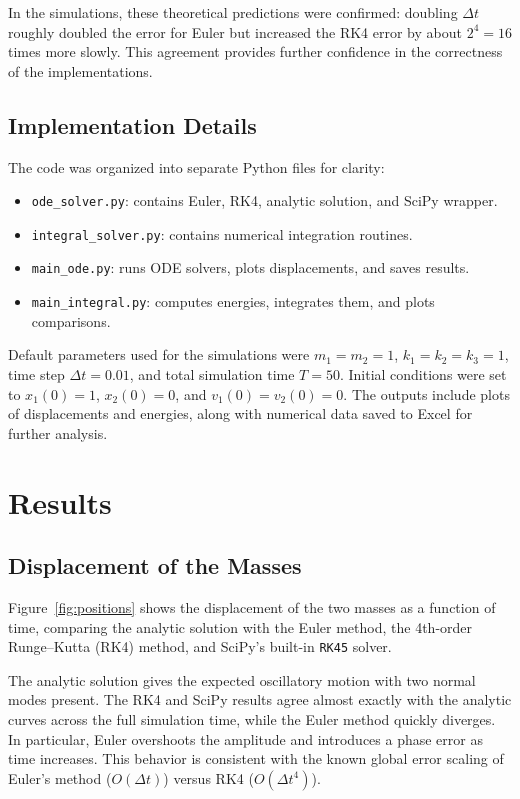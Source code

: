 \documentclass[12pt]{article}
\begin{document}
In the simulations, these theoretical predictions were confirmed: doubling $\Delta t$ roughly doubled the error for Euler but increased the RK4 error by about $2^4 = 16$ times more slowly. This agreement provides further confidence in the correctness of the implementations.


\subsection{Implementation Details}
The code was organized into separate Python files for clarity:
\begin{itemize}
    \item \texttt{ode\_solver.py}: contains Euler, RK4, analytic solution, and SciPy wrapper.
    \item \texttt{integral\_solver.py}: contains numerical integration routines.
    \item \texttt{main\_ode.py}: runs ODE solvers, plots displacements, and saves results.
    \item \texttt{main\_integral.py}: computes energies, integrates them, and plots comparisons.
\end{itemize}

Default parameters used for the simulations were $m_1 = m_2 = 1$, $k_1 = k_2 = k_3 = 1$, time step $\Delta t = 0.01$, and total simulation time $T = 50$. 
Initial conditions were set to $x_1(0) = 1$, $x_2(0) = 0$, and $v_1(0) = v_2(0) = 0$. 
The outputs include plots of displacements and energies, along with numerical data saved to Excel for further analysis.

\section{Results}

\subsection{Displacement of the Masses}
Figure~\ref{fig:positions} shows the displacement of the two masses as a function of time, comparing the analytic solution with the Euler method, the 4th-order Runge--Kutta (RK4) method, and SciPy's built-in \texttt{RK45} solver. 

The analytic solution gives the expected oscillatory motion with two normal modes present. The RK4 and SciPy results agree almost exactly with the analytic curves across the full simulation time, while the Euler method quickly diverges. In particular, Euler overshoots the amplitude and introduces a phase error as time increases. This behavior is consistent with the known global error scaling of Euler's method ($O(\Delta t)$) versus RK4 ($O(\Delta t^4)$).
\end{document}

